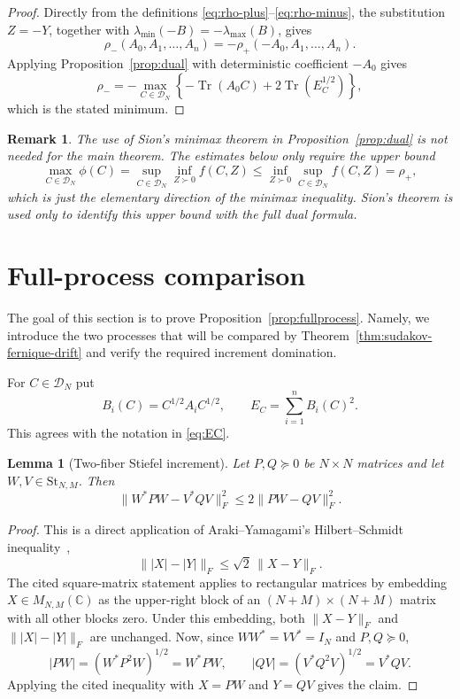 \documentclass{article}
\newtheorem{lemma}[theorem]{Lemma}
\newtheorem{remark}[theorem]{Remark}
\newcommand{\C}{\mathbb C}
\newcommand{\DN}{\mathcal D_N}
\newcommand{\St}{\mathrm{St}}
\DeclareMathOperator{\Tr}{Tr}
\begin{document}
\begin{proof}
	Directly from the definitions \eqref{eq:rho-plus}--\eqref{eq:rho-minus},
	the substitution \(Z=-Y\), together with
	\(\lambda_{\min}(-B)=-\lambda_{\max}(B)\), gives
	\[
		\rho_-(A_0,A_1,\ldots,A_n)=-\rho_+(-A_0,A_1,\ldots,A_n).
	\]
	Applying Proposition~\ref{prop:dual} with deterministic coefficient $-A_0$
	gives
	\[
		\rho_-=
		-\max_{C\in\DN}
		\left\{
		-\Tr(A_0C)+2\Tr(E_C^{1/2})
		\right\},
	\]
	which is the stated minimum.
\end{proof}

\begin{remark}
	The use of Sion's minimax theorem in Proposition~\ref{prop:dual} is not needed
	for the main theorem.  The estimates below only require the upper bound
	\[
		\max_{C\in\DN}\phi(C)
		=
		\sup_{C\in\DN}\inf_{Z\succ0}f(C,Z)
		\le
		\inf_{Z\succ0}\sup_{C\in\DN}f(C,Z)
		=
		\rho_+,
	\]
	which is just the elementary direction of the minimax inequality.  Sion's
	theorem is used only to identify this upper bound with the full dual formula.
\end{remark}

\section{Full-process comparison}
\label{sec:full-process}

The goal of this section is to prove Proposition~\ref{prop:fullprocess}.  Namely,
we introduce the two processes that will be compared by
Theorem~\ref{thm:sudakov-fernique-drift} and verify the required increment
domination.

For $C\in\DN$ put
\[
	B_i(C)=C^{1/2}A_iC^{1/2},
	\qquad
	E_C=\sum_{i=1}^n B_i(C)^2.
\]
This agrees with the notation in \eqref{eq:EC}.

\begin{lemma}[Two-fiber Stiefel increment]
	\label{lem:twofiber}
	Let $P,Q\succeq0$ be $N\times N$ matrices and let $W,V\in\St_{N,M}$.
	Then
	\[
		\|W^*PW-V^*QV\|_F^2\le 2\|PW-QV\|_F^2.
	\]
\end{lemma}

\begin{proof}
	This is a direct application of Araki--Yamagami's Hilbert--Schmidt
	inequality~\cite[Theorem~1]{ArakiYamagami1981},
	\[
		\||X|-|Y|\|_F\le \sqrt2\,\|X-Y\|_F.
	\]
	The cited square-matrix statement applies to rectangular matrices by
	embedding \(X\in M_{N,M}(\C)\) as the upper-right block of an
	\((N+M)\times(N+M)\) matrix with all other blocks zero.  Under this
	embedding, both \(\|X-Y\|_F\) and \(\||X|-|Y|\|_F\) are unchanged.
	Now, since $WW^*=VV^*=I_N$ and $P,Q\succeq0$,
	\[
		|PW|=(W^*P^2W)^{1/2}=W^*PW,\qquad
		|QV|=(V^*Q^2V)^{1/2}=V^*QV.
	\]
	Applying the cited inequality with $X=PW$ and $Y=QV$ gives the claim.
\end{proof}
\end{document}
